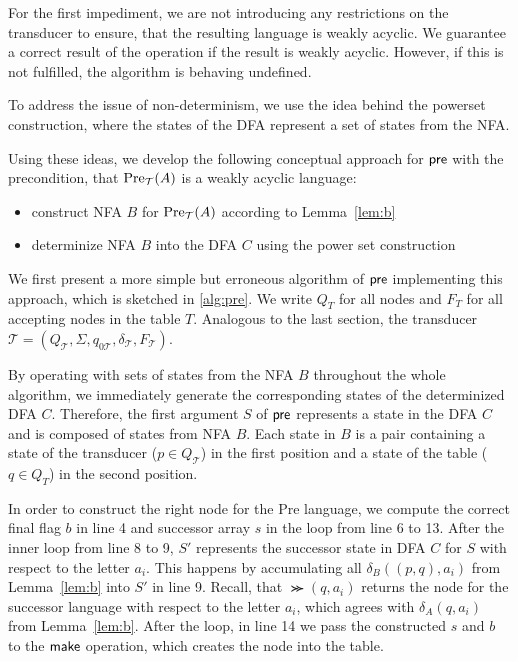 \par

For the first impediment, we are not introducing any restrictions on the transducer to ensure, that the resulting language is weakly acyclic. We guarantee a correct result of the operation if the result is weakly acyclic. However, if this is not fulfilled, the algorithm is behaving undefined. 

\par

To address the issue of non-determinism, we use the idea behind the powerset construction, where the states of the DFA represent a set of states from the NFA. 

\par 

Using these ideas, we develop the following conceptual approach for $\operatorname{\textsf{pre}}$ with the precondition, that $\operatorname{\text{Pre}}_{\mathcal{T}}(A)$ is a weakly acyclic language:
\begin{itemize}[-,noitemsep]
\item construct NFA $B$ for $\operatorname{\text{Pre}}_{\mathcal{T}}(A)$ according to Lemma~\ref{lem:b}
\item determinize NFA $B$ into the DFA $C$ using the power set construction
\end{itemize}

We first present a more simple but erroneous algorithm of $\operatorname{\textsf{pre}}$ implementing this approach, which is sketched in \autoref{alg:pre}. We write $Q_{T}$ for all nodes and $F_{T}$ for all accepting nodes in the table $T$. Analogous to the last section, the transducer $\mathcal{T} = (Q_{\mathcal{T}},\Sigma,q_{0\mathcal{T}},\delta_{\mathcal{T}},F_{\mathcal{T}})$.

By operating with sets of states from the NFA $B$ throughout the whole algorithm, we immediately generate the corresponding states of the determinized DFA $C$.
Therefore, the first argument $S$ of $\operatorname{\textsf{pre}}$ represents a state in the DFA $C$ and is composed of states from NFA $B$.  
Each state in $B$ is a pair containing a state of the transducer ($ p \in Q_{\mathcal{T}}$) in the first position and a state of the table ($ q \in Q_{T}$) in the second position.

In order to construct the right node for the Pre language, we compute the correct final flag $b$ in line 4 and successor array $s$ in the loop from line 6 to 13. After the inner loop from line 8 to 9, $S'$ represents the successor state in DFA $C$ for $S$ with respect to the letter $a_{i}$. This happens by accumulating all $\delta_{B}((p,q),a_{i})$ from Lemma~\autoref{lem:b} into $S'$ in line 9. Recall, that $\Succ(q,a_{i})$ returns the node for the successor language with respect to the letter $a_{i}$, which agrees with $\delta_{A}(q,a_{i})$ from Lemma~\autoref{lem:b}.
After the loop, in line 14 we pass the constructed $s$ and $b$ to the $\operatorname{\textsf{make}}$ operation, which creates the node into the table.





